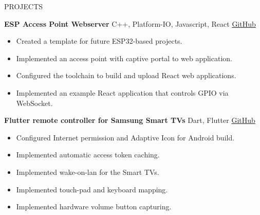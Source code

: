 \documentclass{resume} %
\begin{document}
\begin{rSection}{PROJECTS}
    \vspace{-1.25em}
    \item \textbf{ESP Access Point Webserver} {C++, Platform-IO, Javascript, React} \hfill \href{https://github.com/h9419/ESP_AP_Webserver}{GitHub}
    \begin{itemize}
        \itemsep -3pt {}
        \item Created a template for future ESP32-based projects.
        \item Implemented an access point with captive portal to web application.
        \item Configured the toolchain to build and upload React web applications.
        \item Implemented an example React application that controls GPIO via WebSocket.
    \end{itemize}
    \item \textbf{Flutter remote controller for Samsung Smart TVs} {Dart, Flutter} \hfill \href{https://github.com/h9419/flutter_samsung_remote}{GitHub}
    \begin{itemize}
        \itemsep -3pt {}
        \item Configured Internet permission and Adaptive Icon for Android build.
        \item Implemented automatic access token caching.
        \item Implemented wake-on-lan for the Smart TVs.
        \item Implemented touch-pad and keyboard mapping.
        \item Implemented hardware volume button capturing.
    \end{itemize}
\end{rSection}
\end{document}
